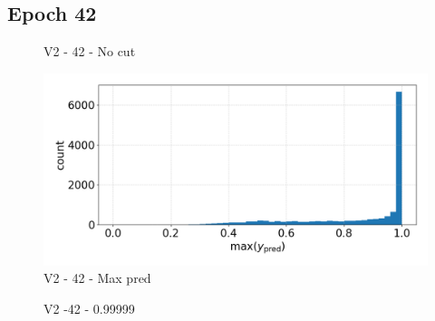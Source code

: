 \subsection{Epoch 42}
\begin{figure}[h]
    \centering
    \qquad
    \caption{V2 - 42 - No cut\label{fig:synth_spectra}}
\end{figure}
\begin{figure}
    \centering
    \includegraphics[width=.6\linewidth]{figures/v2/vit_model_V2max_ypred_42.png}
    \caption{V2 - 42 -  Max pred}
    \label{fig:Epoch42}
\end{figure}
\begin{figure}[h]
    \centering
    \qquad
    \caption{V2 -42 - 0.99999 \label{fig:synth_spectra}}
\end{figure}
